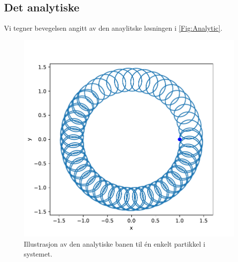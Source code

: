 \documentclass[reprint,english,notitlepage, nofootinbib]{revtex4-1}  %
\begin{document}
\subsection*{Det analytiske}

Vi tegner bevegelsen angitt av den anaylitske løsningen i \autoref{Fig:Analytic}.

\begin{figure}[H]
\centering
\includegraphics[scale=0.5]{../Images/AnalyticA.pdf}
\caption{Illustrasjon av den analytiske banen til én enkelt partikkel i systemet.}
\label{Fig:Analytic}
\end{figure}
\end{document}
